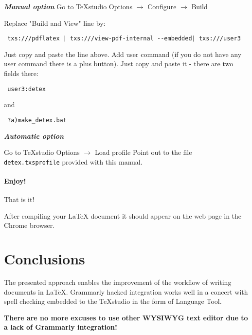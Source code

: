 \documentclass[]{spie}  %
\begin{document}
\clearpage
\noindent \textbf{\textit{Manual option}}
Go to TeXstudio Options \(\rightarrow\) Configure \(\rightarrow\)  Build

Replace "Build and View" line by:
\begin{verbatim}
 txs:///pdflatex | txs:///view-pdf-internal --embedded| txs:///user3
 \end{verbatim}
 Just copy and paste the line above.
 Add user command (if you do not have any user command there is a plus button).
 Just copy and paste it - there are two fields there:
 \begin{verbatim}
 user3:detex
 \end{verbatim}
 and 
 \begin{verbatim}
 ?a)make_detex.bat
 \end{verbatim}
 
\noindent \textbf{\textit{Automatic option}}

Go to TeXstudio Options \(\rightarrow\) Load profile
Point out to the file \verb|detex.txsprofile| provided with this manual.

\paragraph{Enjoy!} That is it! 

After compiling your LaTeX document it should appear on the web page in the Chrome browser.

\section{Conclusions}
The presented approach enables the improvement of the workflow of writing documents in LaTeX. 
Grammarly hacked integration works well in a concert with spell checking embedded to the TeXstudio in the form of Language Tool.

\textbf{There are no more excuses to use other WYSIWYG text editor due to a lack of Grammarly integration!}
\end{document}

